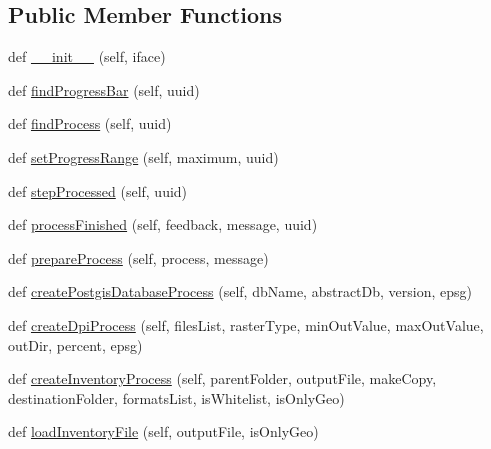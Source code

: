 \subsection*{Public Member Functions}
\begin{DoxyCompactItemize}
\item 
def \mbox{\hyperlink{class_dsg_tools_1_1_processing_tools_1_1process_manager_1_1_process_manager_a43cebabb5fc93fb7888976a97dc353ad}{\+\_\+\+\_\+init\+\_\+\+\_\+}} (self, iface)
\item 
def \mbox{\hyperlink{class_dsg_tools_1_1_processing_tools_1_1process_manager_1_1_process_manager_ab6a56eaab22e457bcb0eb8a9f70e3e05}{find\+Progress\+Bar}} (self, uuid)
\item 
def \mbox{\hyperlink{class_dsg_tools_1_1_processing_tools_1_1process_manager_1_1_process_manager_a3cb0f2196fab53adc17312b1eadd2386}{find\+Process}} (self, uuid)
\item 
def \mbox{\hyperlink{class_dsg_tools_1_1_processing_tools_1_1process_manager_1_1_process_manager_a6b891be03fdd827eff9a157038560cd2}{set\+Progress\+Range}} (self, maximum, uuid)
\item 
def \mbox{\hyperlink{class_dsg_tools_1_1_processing_tools_1_1process_manager_1_1_process_manager_a9b8eea4c358a48a612ac8f2d285708b4}{step\+Processed}} (self, uuid)
\item 
def \mbox{\hyperlink{class_dsg_tools_1_1_processing_tools_1_1process_manager_1_1_process_manager_a3054cb26b2103882257b1d2008bec546}{process\+Finished}} (self, feedback, message, uuid)
\item 
def \mbox{\hyperlink{class_dsg_tools_1_1_processing_tools_1_1process_manager_1_1_process_manager_a314d0e639c22ed78d70c63a6740a5337}{prepare\+Process}} (self, process, message)
\item 
def \mbox{\hyperlink{class_dsg_tools_1_1_processing_tools_1_1process_manager_1_1_process_manager_a0fb7d4b7632e7b9f848f616f0ca0efbe}{create\+Postgis\+Database\+Process}} (self, db\+Name, abstract\+Db, version, epsg)
\item 
def \mbox{\hyperlink{class_dsg_tools_1_1_processing_tools_1_1process_manager_1_1_process_manager_ae8be5cb86cdef40fe5c2ed6544fbb235}{create\+Dpi\+Process}} (self, files\+List, raster\+Type, min\+Out\+Value, max\+Out\+Value, out\+Dir, percent, epsg)
\item 
def \mbox{\hyperlink{class_dsg_tools_1_1_processing_tools_1_1process_manager_1_1_process_manager_a28a26a3c90baa1c7416b92c2c34e44c7}{create\+Inventory\+Process}} (self, parent\+Folder, output\+File, make\+Copy, destination\+Folder, formats\+List, is\+Whitelist, is\+Only\+Geo)
\item 
def \mbox{\hyperlink{class_dsg_tools_1_1_processing_tools_1_1process_manager_1_1_process_manager_a0c50cae9890b30ee3d01b34622ca0dbb}{load\+Inventory\+File}} (self, output\+File, is\+Only\+Geo)
\end{DoxyCompactItemize}
